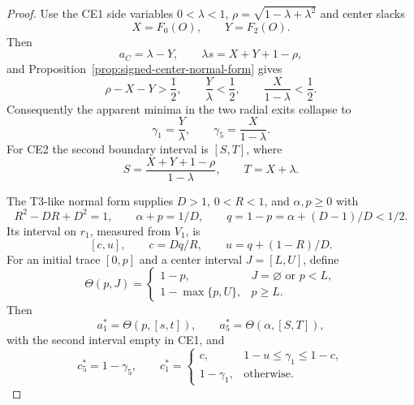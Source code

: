 \begin{proof}
Use the CE1 side variables $0<\lambda<1$,
$\rho=\sqrt{1-\lambda+\lambda^2}$ and center slacks
\[
 X=F_0(O),\qquad Y=F_2(O).
\]
Then
\[
 a_C=\lambda-Y,\qquad
 \lambda s=X+Y+1-\rho,
\]
and Proposition~\ref{prop:signed-center-normal-form} gives
\[
 \rho-X-Y>\frac12,\qquad
 \frac Y\lambda<\frac12,\qquad
 \frac X{1-\lambda}<\frac12.
\]
Consequently the apparent minima in the two radial exits collapse to
\[
 \gamma_1=\frac Y\lambda,\qquad
 \gamma_5=\frac X{1-\lambda}.
\]
For CE2 the second boundary interval is $[S,T]$, where
\[
 S=\frac{X+Y+1-\rho}{1-\lambda},\qquad T=X+\lambda.
\]

The T3-like normal form supplies $D>1$, $0<R<1$, and $\alpha,p\ge0$ with
\[
 R^2-DR+D^2=1,\qquad \alpha+p=1/D,\qquad
 q=1-p=\alpha+(D-1)/D<1/2.
\]
Its interval on $r_1$, measured from $V_1$, is
\[
 [c,u],\qquad c=Dq/R,\qquad u=q+(1-R)/D.
\]
For an initial trace $[0,p]$ and a center interval $J=[L,U]$, define
\[
 \Theta(p,J)=
 \begin{cases}
 1-p,&J=\varnothing\text{ or }p<L,\\
 1-\max\{p,U\},&p\ge L.
 \end{cases}
\]
Then
\[
 a_1^\ast=\Theta(p,[s,t]),\qquad
 a_5^\ast=\Theta(\alpha,[S,T]),
\]
with the second interval empty in CE1, and
\[
 c_5^\ast=1-\gamma_5,\qquad
 c_1^\ast=
 \begin{cases}
 c,&1-u\le\gamma_1\le1-c,\\
 1-\gamma_1,&\text{otherwise}.
 \end{cases}
\]


\end{proof}
